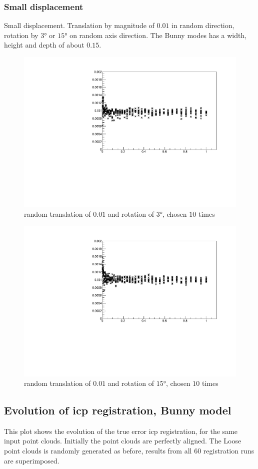 {\subsubsection{Small displacement}
Small displacement. Translation by magnitude of $0.01$ in random direction, rotation by $3 \si{\degree}$ or $15 \si{\degree}$ on random axis direction. The Bunny modes has a width, height and depth of about $0.15$.

\begin{figure}[H]
\centering
\includegraphics[width=.7\textwidth]{fig/bunny_globsmall.pdf}
\caption{random translation of $0.01$ and rotation of $3 \si{\degree}$, chosen $10$ times}
\label{fig:bunny_globsmall}
\end{figure}

\begin{figure}[H]
\centering
\includegraphics[width=.7\textwidth]{fig/bunny_globmed.pdf}
\caption{random translation of $0.01$ and rotation of $15 \si{\degree}$, chosen $10$ times}
\label{fig:bunny_globmed}
\end{figure}

\subsection{Evolution of \gls{icp} registration, Bunny model}
This plot shows the evolution of the true error \gls{icp} registration, for the same input point clouds. Initially the point clouds are perfectly aligned. The Loose point clouds is randomly generated as before, results from all $60$ registration runs are superimposed.

}

